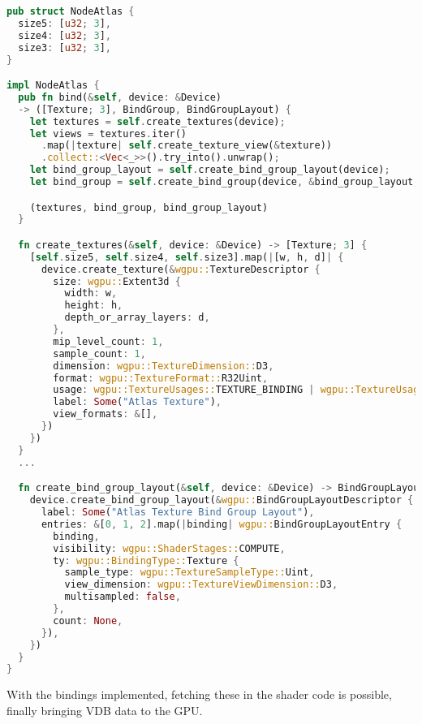 \begin{lstlisting}[language=rust, captionpos=b, caption={
    \texttt{NodeAtlas} definition: The three fields are the sizes of each atlas.
    The \texttt{create\_textures} creates three textures, sets the correct dimensions and sets value type to \texttt{R32Uint} represent a 4-byte single channel, which can be used depending on what the value represents.
    The \texttt{create\_bind\_group\_layout} prepare the binding for compute shaders, setting the sample type to \texttt{Uint} to ease access to the atlases' data.
},label={atlas2idx}]
pub struct NodeAtlas {
  size5: [u32; 3],
  size4: [u32; 3],
  size3: [u32; 3],
}

impl NodeAtlas {
  pub fn bind(&self, device: &Device)
  -> ([Texture; 3], BindGroup, BindGroupLayout) {
    let textures = self.create_textures(device);
    let views = textures.iter()
      .map(|texture| self.create_texture_view(&texture))
      .collect::<Vec<_>>().try_into().unwrap();
    let bind_group_layout = self.create_bind_group_layout(device);
    let bind_group = self.create_bind_group(device, &bind_group_layout, &views);

    (textures, bind_group, bind_group_layout)
  }

  fn create_textures(&self, device: &Device) -> [Texture; 3] {
    [self.size5, self.size4, self.size3].map(|[w, h, d]| {
      device.create_texture(&wgpu::TextureDescriptor {
        size: wgpu::Extent3d {
          width: w,
          height: h,
          depth_or_array_layers: d,
        },
        mip_level_count: 1,
        sample_count: 1,
        dimension: wgpu::TextureDimension::D3,
        format: wgpu::TextureFormat::R32Uint,
        usage: wgpu::TextureUsages::TEXTURE_BINDING | wgpu::TextureUsages::COPY_DST,
        label: Some("Atlas Texture"),
        view_formats: &[],
      })
    })
  }
  ...

  fn create_bind_group_layout(&self, device: &Device) -> BindGroupLayout {
    device.create_bind_group_layout(&wgpu::BindGroupLayoutDescriptor {
      label: Some("Atlas Texture Bind Group Layout"),
      entries: &[0, 1, 2].map(|binding| wgpu::BindGroupLayoutEntry {
        binding,
        visibility: wgpu::ShaderStages::COMPUTE,
        ty: wgpu::BindingType::Texture {
          sample_type: wgpu::TextureSampleType::Uint,
          view_dimension: wgpu::TextureViewDimension::D3,
          multisampled: false,
        },
        count: None,
      }),
    })
  }
}
\end{lstlisting}
        With the bindings implemented, fetching these in the shader code is possible, finally bringing VDB data to the GPU.

